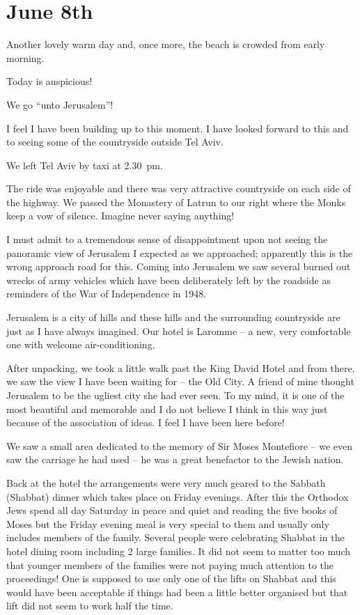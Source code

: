 \section{June 8th}

Another lovely warm day and, once more, the beach is crowded from
early morning.

Today is auspicious!

We go ``unto Jerusalem''!

I feel I have been building up to this moment.  I have looked forward
to this and to seeing some of the countryside outside Tel Aviv.

We left Tel Aviv by taxi at 2.30~pm.

The ride was enjoyable and there was very attractive countryside on
each side of the highway. We passed the Monastery of Latrun to our
right where the Monks keep a vow of silence. Imagine never saying
anything!

I must admit to a tremendous sense of disappointment upon not seeing
the panoramic view of Jerusalem I expected as we approached;
apparently this is the wrong approach road for this. Coming into
Jerusalem we saw several burned out wrecks of army vehicles which have
been deliberately left by the roadside as reminders of the War of
Independence in 1948.

Jerusalem is a city of hills and these hills and the surrounding
countryside are just as I have always imagined. Our hotel is Laromme
-- a new, very comfortable one with welcome air-conditioning.

After unpacking, we took a little walk past the King David Hotel and
from there, we saw the view I have been waiting for -- the Old City. A
friend of mine thought Jerusalem to be the ugliest city she had ever
seen. To my mind, it is one of the most beautiful and memorable and I
do not believe I think in this way just because of the association of
ideas. I feel I have been here before!

We saw a small area dedicated to the memory of Sir Moses Montefiore --
we even saw the carriage he had used -- he was a great benefactor to
the Jewish nation.

Back at the hotel the arrangements were very much geared to the
Sabbath (Shabbat) dinner which takes place on Friday evenings. After
this the Orthodox Jews spend all day Saturday in peace and quiet and
reading the five books of Moses but the Friday evening meal is very
special to them and usually only includes members of the
family. Several people were celebrating Shabbat in the hotel dining
room including 2 large families. It did not seem to matter too much
that younger members of the families were not paying much attention to
the proceedings! One is supposed to use only one of the lifts on
Shabbat and this would have been acceptable if things had been a little
better organised but that lift did not seem to work half the time.

